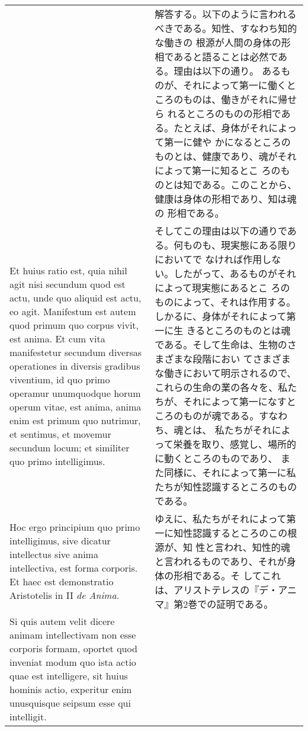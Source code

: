 \documentclass[paper=a4paper,fontsize=10pt,jafontsize=9pt,titlepage]{jlreq}
\begin{document}
\begin{longtable}{p{21em}p{21em}}
 
&

 解答する。以下のように言われるべきである。知性、すなわち知的な働きの
 根源が人間の身体の形相であると語ることは必然である。理由は以下の通り。
 あるものが、それによって第一に働くところのものは、働きがそれに帰せら
 れるところのものの形相である。たとえば、身体がそれによって第一に健や
 かになるところのものとは、健康であり、魂がそれによって第一に知るとこ
 ろのものとは知である。このことから、健康は身体の形相であり、知は魂の
 形相である。
 
\\


 Et huius ratio est, quia nihil agit nisi secundum quod est actu, unde
 quo aliquid est actu, eo agit. Manifestum est autem quod primum quo
 corpus vivit, est anima. Et cum vita manifestetur secundum diversas
 operationes in diversis gradibus viventium, id quo primo operamur
 unumquodque horum operum vitae, est anima, anima enim est primum quo
 nutrimur, et sentimus, et movemur secundum locum; et similiter quo
 primo intelligimus.

 
&

そしてこの理由は以下の通りである。何ものも、現実態にある限りにおいてで
なければ作用しない。したがって、あるものがそれによって現実態にあるとこ
ろのものによって、それは作用する。しかるに、身体がそれによって第一に生
きるところのものとは魂である。そして生命は、生物のさまざまな段階におい
てさまざまな働きにおいて明示されるので、これらの生命の業の各々を、私た
ちが、それによって第一になすところのものが魂である。すなわち、魂とは、
私たちがそれによって栄養を取り、感覚し、場所的に動くところのものであり、
また同様に、それによって第一に私たちが知性認識するところのものである。
 
\\



 Hoc ergo principium quo primo intelligimus, sive dicatur intellectus
 sive anima intellectiva, est forma corporis. Et haec est demonstratio
 Aristotelis in II {\itshape de Anima}.


&

 ゆえに、私たちがそれによって第一に知性認識するところのこの根源が、知
 性と言われ、知性的魂と言われるものであり、それが身体の形相である。そ
 してこれは、アリストテレスの『デ・アニマ』第2巻での証明である。
 
\\



 Si quis autem velit dicere animam intellectivam non esse corporis
 formam, oportet quod inveniat modum quo ista actio quae est
 intelligere, sit huius hominis actio, experitur enim unusquisque
 seipsum esse qui intelligit.


\end{longtable}
\end{document}
